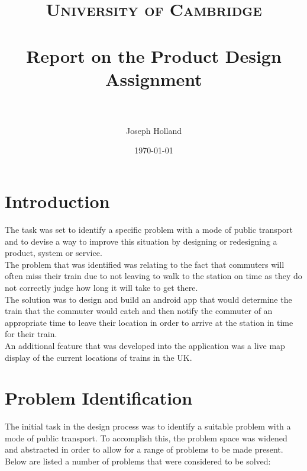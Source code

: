 \documentclass[paper=a4, fontsize=12pt]{scrartcl} %
\title{
\normalfont \normalsize
\textsc{University of Cambridge} \\ [25pt] %
\horrule{0.5pt} \\[0.4cm] %
\huge Report on the Product Design Assignment \\ %
\horrule{2pt} \\[0.5cm] %
}
\author{Joseph Holland} %
\date{\normalsize\today} %
\numberwithin{equation}{section} %
\numberwithin{figure}{section} %
\numberwithin{table}{section} %
\begin{document}
\maketitle %


    \section{Introduction}

        The task was set to identify a specific problem with a mode of public transport and to devise a way to improve this situation by designing or redesigning a product, system or service.\\

        The problem that was identified was relating to the fact that commuters will often miss their train due to not leaving to walk to the station on time as they do not correctly judge how long it will take to get there.\\

        The solution was to design and build an android app that would determine the train that the commuter would catch and then notify the commuter of an appropriate time to leave their location in order to arrive at the station in time for their train.\\

        An additional feature that was developed into the application was a live map display of the current locations of trains in the UK.


    \pagebreak
    \section{Problem Identification}

        The initial task in the design process was to identify a suitable problem with a mode of public transport. To accomplish this, the problem space was widened and abstracted in order to allow for a range of problems to be made present. Below are listed a number of problems that were considered to be solved:
\end{document}
